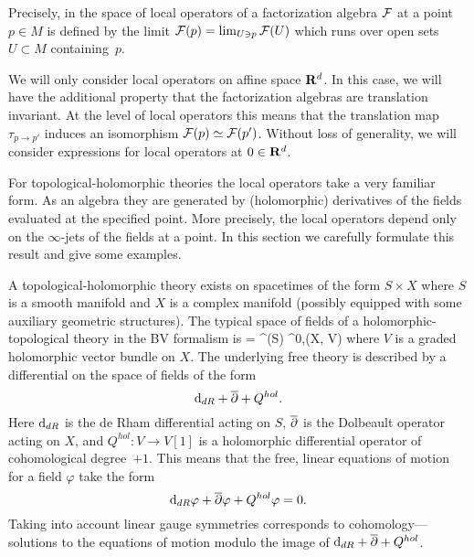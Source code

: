 Precisely, in \cite[Definition 10.1.0.1]{CG2} the space of local operators of a factorization algebra $\mathcal F$ at a point $p \in M$ is defined by the limit $\mathcal F(p) = \lim_{U \ni p} \mathcal F(U)$ which runs over open sets $U \subset M$ containing~$p$.

We will only consider local operators on affine space $\mathbf{R}^d$. 
In this case, we will have the additional property that the factorization algebras are translation invariant.
At the level of local operators this means that the translation map $\tau_{p \to p'}$ induces an isomorphism $\mathcal F(p) \simeq \mathcal F(p')$. 
Without loss of generality, we will consider expressions for local operators at $0 \in \mathbf{R}^d$.

For topological-holomorphic theories the local operators take a very familiar form.
As an algebra they are generated by (holomorphic) derivatives of the fields evaluated at the specified point. 
More precisely, the local operators depend only on the $\infty$-jets of the fields at a point.
In this section we carefully formulate this result and give some examples.

\parsec[s:free]

%
%
A topological-holomorphic theory exists on spacetimes of the form $S \times X$ where $S$ is a smooth manifold and $X$ is a complex manifold (possibly equipped with some auxiliary geometric structures). 
The typical space of fields of a holomorphic-topological theory in the BV formalism is
\beqn\label{eqn:cE}
\cE = \Omega^\bu (S) \hotimes \Omega^{0,\bu}(X, V) 
\eeqn
where $V$ is a graded holomorphic vector bundle on $X$.
The underlying free theory is described by a differential on the space of fields of the form
\[
{\rm d}_{dR} + \overline{\partial} + Q^{hol} .
\]
Here ${\rm d}_{dR}$ is the de Rham differential acting on $S$, $\overline{\partial}$ is the Dolbeault operator acting on $X$, and $Q^{hol} \colon V \to V[1]$ is a holomorphic differential operator of cohomological degree~$+1$.
This means that the free, linear equations of motion for a field $\varphi$ take the form
\[
{\rm d}_{dR} \varphi + \overline{\partial} \varphi + Q^{hol} \varphi = 0 .
\]
Taking into account linear gauge symmetries corresponds to cohomology---solutions to the equations of motion modulo the image of ${\rm d}_{dR} + \overline{\partial} + Q^{hol}$.

